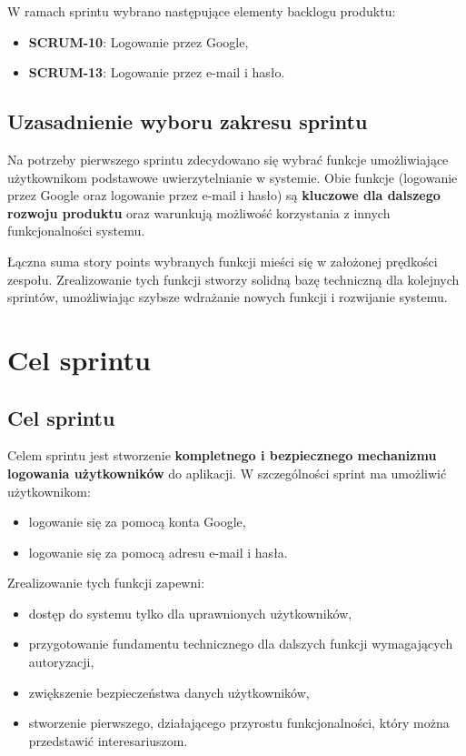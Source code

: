 \documentclass[12pt,a4paper,colorlinks=true,linkcolor=NavyBlue,citecolor=red,urlcolor=NavyBlue]{book}
\begin{document}
W ramach sprintu wybrano następujące elementy backlogu produktu:
\begin{itemize}[topsep=0pt, itemsep=0.3em]
    \item \textbf{SCRUM-10}: Logowanie przez Google,
    \item \textbf{SCRUM-13}: Logowanie przez e-mail i hasło.
\end{itemize}

\section{Uzasadnienie wyboru zakresu sprintu}

Na potrzeby pierwszego sprintu zdecydowano się wybrać funkcje umożliwiające użytkownikom podstawowe uwierzytelnianie w systemie.  
Obie funkcje (logowanie przez Google oraz logowanie przez e-mail i hasło) są \textbf{kluczowe dla dalszego rozwoju produktu} oraz warunkują możliwość korzystania z innych funkcjonalności systemu.

\vspace{1em}
Łączna suma story points wybranych funkcji mieści się w założonej prędkości zespołu.  
Zrealizowanie tych funkcji stworzy solidną bazę techniczną dla kolejnych sprintów, umożliwiając szybsze wdrażanie nowych funkcji i rozwijanie systemu.


\newpage
\thispagestyle{empty}
\null
\newpage

\chapter{Cel sprintu}

\section{Cel sprintu}
Celem sprintu jest stworzenie \textbf{kompletnego i bezpiecznego mechanizmu logowania użytkowników} do aplikacji.  
W szczególności sprint ma umożliwić użytkownikom:
\begin{itemize}[itemsep=0.3em]
    \item logowanie się za pomocą konta Google,
    \item logowanie się za pomocą adresu e-mail i hasła.
\end{itemize}

\vspace{1em}
Zrealizowanie tych funkcji zapewni:
\begin{itemize}[itemsep=0.3em]
    \item dostęp do systemu tylko dla uprawnionych użytkowników,
    \item przygotowanie fundamentu technicznego dla dalszych funkcji wymagających autoryzacji,
    \item zwiększenie bezpieczeństwa danych użytkowników,
    \item stworzenie pierwszego, działającego przyrostu funkcjonalności, który można przedstawić interesariuszom.
\end{itemize}
\end{document}
